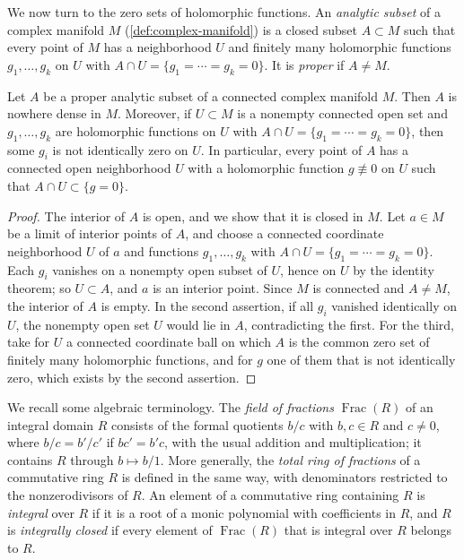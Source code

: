 We now turn to the zero sets of holomorphic functions. An \emph{analytic subset} of a complex manifold $M$ (\cref{def:complex-manifold}) is a closed subset $A\subset M$ such that every point of $M$ has a neighborhood $U$ and finitely many holomorphic functions $g_1,\ldots,g_k$ on $U$ with $A\cap U=\{g_1=\cdots=g_k=0\}$. It is \emph{proper} if $A\neq M$.

\begin{lemma}\label{lem:proper-analytic-nowhere-dense}
Let $A$ be a proper analytic subset of a connected complex manifold $M$. Then $A$ is nowhere dense in $M$. Moreover, if $U\subset M$ is a nonempty connected open set and $g_1,\ldots,g_k$ are holomorphic functions on $U$ with $A\cap U=\{g_1=\cdots=g_k=0\}$, then some $g_i$ is not identically zero on $U$. In particular, every point of $A$ has a connected open neighborhood $U$ with a holomorphic function $g\not\equiv0$ on $U$ such that $A\cap U\subset\{g=0\}$.
\end{lemma}
\begin{proof}
The interior of $A$ is open, and we show that it is closed in $M$. Let $a\in M$ be a limit of interior points of $A$, and choose a connected coordinate neighborhood $U$ of $a$ and functions $g_1,\ldots,g_k$ with $A\cap U=\{g_1=\cdots=g_k=0\}$. Each $g_i$ vanishes on a nonempty open subset of $U$, hence on $U$ by the identity theorem; so $U\subset A$, and $a$ is an interior point. Since $M$ is connected and $A\neq M$, the interior of $A$ is empty. In the second assertion, if all $g_i$ vanished identically on $U$, the nonempty open set $U$ would lie in $A$, contradicting the first. For the third, take for $U$ a connected coordinate ball on which $A$ is the common zero set of finitely many holomorphic functions, and for $g$ one of them that is not identically zero, which exists by the second assertion.
\end{proof}

We recall some algebraic terminology. The \emph{field of fractions} $\operatorname{Frac}(R)$ of an integral domain $R$ consists of the formal quotients $b/c$ with $b,c\in R$ and $c\neq0$, where $b/c=b'/c'$ if $bc'=b'c$, with the usual addition and multiplication; it contains $R$ through $b\mapsto b/1$. More generally, the \emph{total ring of fractions} of a commutative ring $R$ is defined in the same way, with denominators restricted to the nonzerodivisors of $R$. An element of a commutative ring containing $R$ is \emph{integral} over $R$ if it is a root of a monic polynomial with coefficients in $R$, and $R$ is \emph{integrally closed} if every element of $\operatorname{Frac}(R)$ that is integral over $R$ belongs to $R$.

